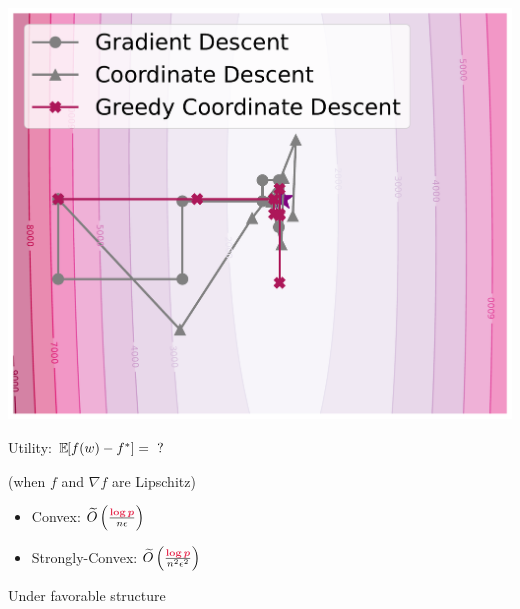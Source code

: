 \documentclass{beamer}
\begin{document}
\hspace{-3.3em}
\begin{frame}
  \vspace{-0.3em}
  \includegraphics[width=1.17\textwidth]{example_3.pdf}
\end{frame}





\begin{frame}
  \vspace{1em}
  \Huge
  Utility: $\mathbb E_{} \hspace{-0.29em} \left[ f(w) - f^* \right] = \text{ ?}$

  \vspace{0.5em}
  {
    \begin{center}
      \huge   (when $f$ and $\nabla f$ are Lipschitz)
    \end{center}
  }

  \pause

  \vspace{1em}
  \begin{itemize}
  \item Convex: $\widetilde O\left( \frac{\emphcol{\log{p}}}{n\epsilon} \right)$
  \item Strongly-Convex:  $\widetilde O\left( \frac{\emphcol{\log{p}}}{n^2\epsilon^2} \right)$
  \end{itemize}

  \vspace{.5em}
  \begin{center}
    \huge
    Under favorable structure
  \end{center}

\end{frame}
\end{document}
